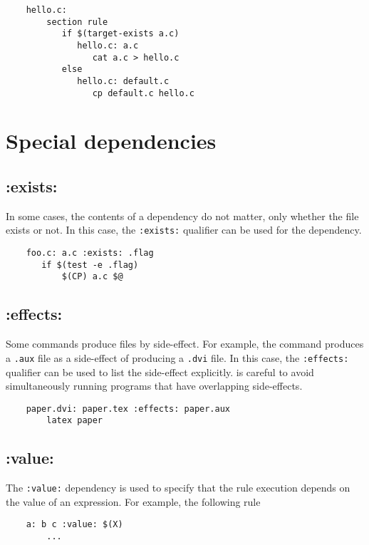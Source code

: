 \begin{verbatim}
    hello.c:
        section rule
           if $(target-exists a.c)
              hello.c: a.c
                 cat a.c > hello.c
           else
              hello.c: default.c
                 cp default.c hello.c
\end{verbatim}

\section{Special dependencies}

\subsection{:exists:}

In some cases, the contents of a dependency do not matter, only whether the file exists or not.  In
this case, the \verb+:exists:+ qualifier can be used for the dependency.

\begin{verbatim}
    foo.c: a.c :exists: .flag
       if $(test -e .flag)
           $(CP) a.c $@
\end{verbatim}

\subsection{:effects:}

Some commands produce files by side-effect.  For example, the
 command produces a \verb+.aux+ file as a side-effect of
producing a \verb+.dvi+ file.  In this case, the \verb+:effects:+
qualifier can be used to list the side-effect explicitly.
 is careful to avoid simultaneously running programs that
have overlapping side-effects.

\begin{verbatim}
    paper.dvi: paper.tex :effects: paper.aux
        latex paper
\end{verbatim}

\subsection{:value:}
The \verb+:value:+ dependency is used to specify that the rule execution depends on the value of an
expression.  For example, the following rule

\begin{verbatim}
    a: b c :value: $(X)
        ...
\end{verbatim}

